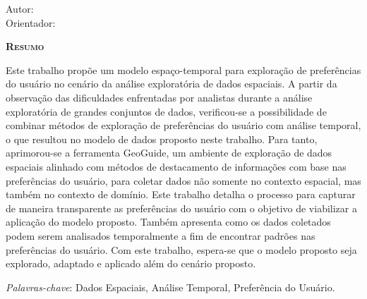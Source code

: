 \begin{center}
	{\Large{\textbf{\myThesis}}}
\end{center}

\vspace{1cm}

\begin{flushright}
	Autor: \myName\\
	Orientador: \mySupervisorName
\end{flushright}

\vspace{1cm}

\begin{center}
	\Large{\textsc{\textbf{Resumo}}}
\end{center}

\noindent Este trabalho propõe um modelo espaço-temporal para exploração de preferências do usuário no cenário da análise exploratória de dados espaciais. A partir da observação das dificuldades enfrentadas por analistas durante a análise exploratória de grandes conjuntos de dados, verificou-se a possibilidade de combinar métodos de exploração de preferências do usuário com análise temporal, o que resultou no modelo de dados proposto neste trabalho. Para tanto, aprimorou-se a ferramenta GeoGuide, um ambiente de exploração de dados espaciais alinhado com métodos de destacamento de informações com base nas preferências do usuário, para coletar dados não somente no contexto espacial, mas também no contexto de domínio. Este trabalho detalha o processo para capturar de maneira transparente as preferências do usuário com o objetivo de viabilizar a aplicação do modelo proposto. Também apresenta como os dados coletados podem serem analisados temporalmente a fim de encontrar padrões nas preferências do usuário. Com este trabalho, espera-se que o modelo proposto seja explorado, adaptado e aplicado além do cenário proposto.

\noindent\textit{Palavras-chave}: Dados Espaciais, Análise Temporal, Preferência do Usuário.